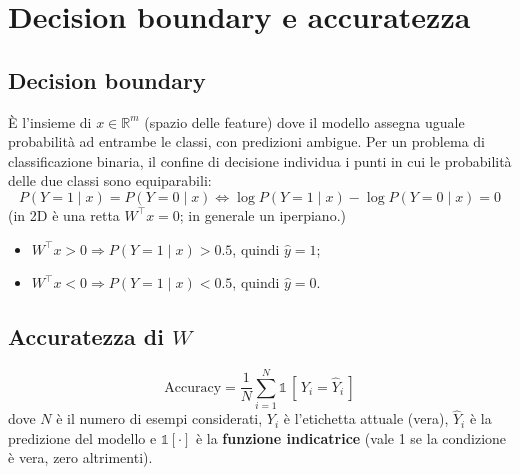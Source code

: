 \documentclass[11pt,a4paper]{article}
\newcommand{\R}{\mathbb{R}}
\begin{document}
\section{Decision boundary e accuratezza}

\subsection{Decision boundary}
È l'insieme di $x\in\R^m$ (spazio delle feature) dove il modello assegna uguale probabilità ad entrambe le classi, con predizioni ambigue. Per un problema di classificazione binaria, il confine di decisione individua i punti in cui le probabilità delle due classi sono equiparabili:
\[
P(Y=1\mid x) = P(Y=0\mid x) \iff \log P(Y=1\mid x) - \log P(Y=0\mid x) = 0
\]
(in 2D è una retta $W^\top x = 0$; in generale un iperpiano.)
\begin{itemize}
  \item $W^\top x > 0 \Rightarrow P(Y=1\mid x) > 0.5$, quindi $\hat{y}=1$;
  \item $W^\top x < 0 \Rightarrow P(Y=1\mid x) < 0.5$, quindi $\hat{y}=0$.
\end{itemize}

\begin{center}
\end{center}

\subsection{Accuratezza di $W$}
\[
\text{Accuracy} = \frac{1}{N}\sum_{i=1}^{N}\mathbb{1}\,[\,Y_i = \hat{Y}_i\,]
\]
dove $N$ è il numero di esempi considerati, $Y_i$ è l'etichetta attuale (vera), $\hat{Y}_i$ è la predizione del modello e $\mathbb{1}[\cdot]$ è la \textbf{funzione indicatrice} (vale 1 se la condizione è vera, zero altrimenti).
\end{document}
